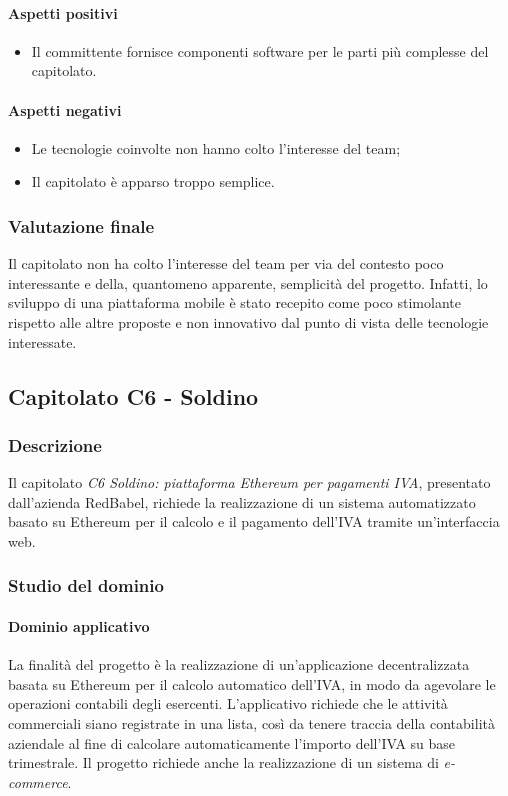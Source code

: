{\paragraph{Aspetti positivi}
\begin{itemize}
	\item Il committente fornisce componenti software per le parti più complesse del capitolato.
\end{itemize}
\paragraph{Aspetti negativi}
\begin{itemize}
	\item Le tecnologie coinvolte non hanno colto l'interesse del team;
	\item Il capitolato è apparso troppo semplice.
\end{itemize}
\subsubsection{Valutazione finale}
Il capitolato non ha colto l'interesse del team per via del contesto poco interessante e della, quantomeno apparente, semplicità del progetto. Infatti, lo 				sviluppo di una piattaforma mobile è stato recepito come poco stimolante rispetto alle altre proposte e non innovativo dal punto di vista delle tecnologie 					interessate. 
		
		
	\subsection{Capitolato C6 - Soldino}
		\subsubsection{Descrizione}
		Il capitolato \emph{C6 Soldino: piattaforma Ethereum per pagamenti IVA}, presentato dall'azienda RedBabel, richiede la realizzazione di un sistema automatizzato basato su Ethereum per il calcolo e il pagamento dell'IVA tramite un'interfaccia web.
		\subsubsection{Studio del dominio}
			\paragraph{Dominio applicativo} \Spazio
			La finalità del progetto è la realizzazione di un'applicazione decentralizzata basata su Ethereum per il calcolo automatico dell'IVA, in modo da agevolare le operazioni contabili degli esercenti. L'applicativo richiede che le attività commerciali siano registrate in una lista, così da tenere traccia della contabilità aziendale al fine di calcolare automaticamente l'importo dell'IVA su base trimestrale. Il progetto richiede anche la realizzazione di un sistema di \emph{e-commerce}.
			
}
